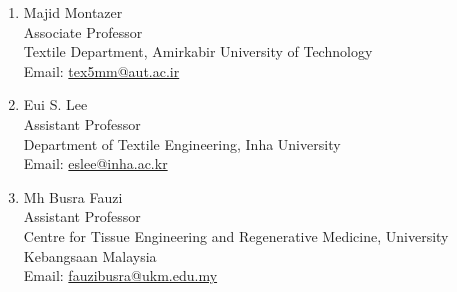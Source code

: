 \documentclass[11pt]{letter}
\begin{document}
\begin{enumerate}
\item Majid Montazer\\
Associate Professor \\
Textile Department, Amirkabir University of Technology\\
Email:  \href{mailto:tex5mm@aut.ac.ir}{tex5mm@aut.ac.ir}\\


\item Eui S. Lee\\
Assistant Professor \\
Department of Textile Engineering, Inha University\\
Email: \href{mailto:eslee@inha.ac.kr}{eslee@inha.ac.kr}\\


\item Mh Busra Fauzi\\
Assistant Professor \\
Centre for Tissue Engineering and Regenerative Medicine, University Kebangsaan Malaysia  \\
Email: \href{mailto:fauzibusra@ukm.edu.my}{fauzibusra@ukm.edu.my}\\



\end{enumerate}


%
%
%
\end{document}
